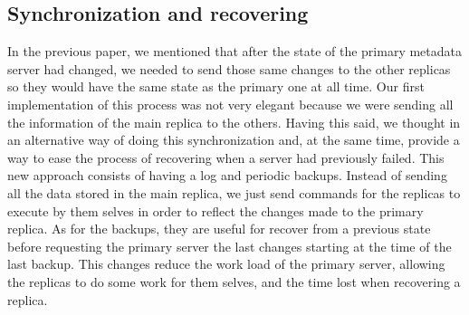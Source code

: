 \subsection{Synchronization and recovering}

In the previous paper, we mentioned that after the state of the primary metadata server had
changed, we needed to send those same changes to the other replicas so they would
have the same state as the primary one at all time. Our first implementation of this process
was not very elegant because we were sending all the information of the main replica to
the others. Having this said, we thought in an alternative way of doing this synchronization
and, at the same time, provide a way to ease the process of recovering when a server had
previously failed.
This new approach consists of having a log and periodic backups. Instead of sending all
the data stored in the main replica, we just send commands for the replicas to execute
by them selves in order to reflect the changes made to the primary replica. As for the
backups, they are useful for recover from a previous state before requesting the primary server the last changes starting at the time of the last backup.
This changes reduce the work load of the primary server, allowing the replicas to do some
work for them selves, and the time lost when recovering a replica.
